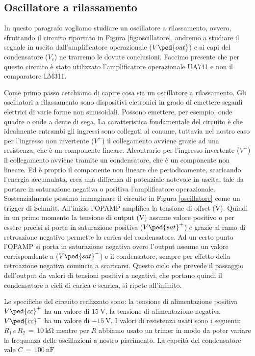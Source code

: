 \subsection*{Oscillatore a rilassamento}

In questo paragrafo vogliamo studiare un oscillatore a rilassamento, ovvero, sfruttando il circuito riportato in Figura \ref{fig:oscillatore}, andremo a studiare il segnale in uscita dall'amplificatore operazionale ($V\ped{out}$) e ai capi del condensatore ($V_c$) ne trarremo le dovute conclusioni. Faccimo presente che per questo circuito è stato utilizzato l'amplificatore operazionale UA741 e non il comparatore LM311.

Come primo passo cerchiamo di capire cosa sia un oscillatore a rilassamento. Gli oscillatori a rilassamento sono dispositivi eletronici in grado di emettere seganli elettrici di varie forme non sinusoidali. Possono emettere, per esempio, onde quadre o onde a dente di sega.
La caratteristica fondamentale del circuito è che idealmente entrambi gli ingressi sono collegati al conume, tuttavia nel nostro caso per l'ingresso non invertente ($V^+$) il collegamento avviene grazie ad una resistenza, che è un componente lineare. Alcontrario per l'ingresso invertente ($V^-$) il collegamento avviene tramite un condensatore, che è un componente non lineare. Ed è proprio il componente non lineare che periodicamente, scaricando l'energia accumulata, crea una diffrenza di potenziale notevole in uscita, tale da portare in saturazione negativa o positiva l'amplificatore operazionale.
Sostenzialmente possimo immaginare il circuito in Figura \ref{oscillatore} come un trigger di Schmitt. All'inizio l'OPAMP amplifica la tensione di offset (V). Quindi in un primo momento la tensione di output (V) assume valore positivo o per essere precisi si porta in saturazione positiva ($V\ped{sat}^+$) e grazie al ramo di retroazione negativo permette la carica del condensatore. Ad un certo punto l'OPAMP si porta in saturazione negativa overo l'output assume un valore corrispondente a ($V\ped{sat}^-$) e il condensatore, sempre per effetto della retroazione negativa comincia a scaricarsi. Questo ciclo che prevede il passaggio dell'output da valori di tensioni positivi a negativi, che portano quindi il condensatore a cicli di carica e scarica, si ripete all'infinito.

Le specifiche del circuito realizzato sono: la tensione di alimentazione positiva $V\ped{cc}^+$ ha un valore di $\SI{+15}{\volt}$, la tensione di alimentazione negativa $V\ped{cc}^-$ ha un valore di $\SI{-15}{\volt}$. I valori di resistenza usati sono i seguenti: $R_1\,e\,R_2\,=\,\SI{10}{\kilo\ohm}$ mentre per $R$ abbiamo usato un trimer in modo da poter variare la frequanza delle oscillazioni a nostro piacimento. La capcità del condensatore vale $C\,=\,\SI{100}{\nano\farad}$

